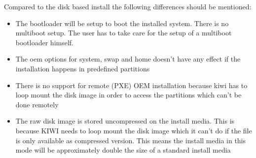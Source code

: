 Compared to the disk based install the following differences
should be mentioned:

\begin{itemize}
\item The bootloader will be setup to boot the installed system. There
      is no multiboot setup. The user has to take care for the setup
      of a multiboot bootloader himself.
\item The oem options for system, swap and home doesn't have any effect
      if the installation happens in predefined partitions
\item There is no support for remote (PXE) OEM installation because kiwi
      has to loop mount the disk image in order to access the partitions
      which can't be done remotely
\item The raw disk image is stored uncompressed on the install media.
      This is because KIWI needs to loop mount the disk image which it can't
      do if the file is only available as compressed version. This means
      the install media in this mode will be approximately double the size
      of a standard install media
\end{itemize}

